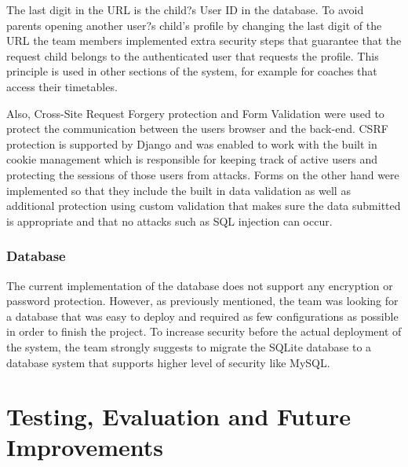 \documentclass{l3proj}
\begin{document}
The last digit in the URL is the child?s User ID in the database. To avoid parents opening another user?s child's profile by changing the last digit of the URL the team members implemented extra security steps that guarantee that the request child belongs to the authenticated user that requests the profile. This principle is used in other sections of the system, for example for coaches that access their timetables.
\\
\par Also, Cross-Site Request Forgery protection and Form Validation were used to protect the communication between the users browser and the back-end. CSRF protection is supported by Django and was enabled to work with the built in cookie management which is responsible for keeping track of active users and protecting the sessions of those users from attacks. Forms on the other hand were implemented so that they include the built in data validation as well as additional protection using custom validation that makes sure the data submitted is appropriate and that no attacks such as SQL injection can occur.

\subsection{Database}
\par
The current implementation of the database does not support any encryption or password protection. However, as previously mentioned, the team was looking for a database that was easy to deploy and required as few configurations as possible in order to finish the project. To increase security before the actual deployment of the system, the team strongly suggests to migrate the SQLite database to a database system that supports higher level of security like MySQL.

\chapter{Testing, Evaluation and Future Improvements}
\label{testevfutimprv}

\end{document}
